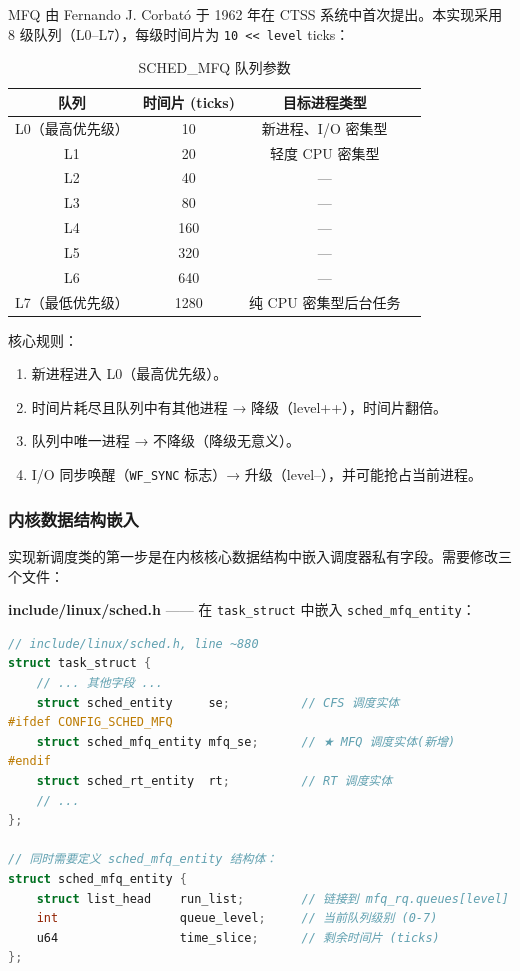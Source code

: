 \documentclass[a4paper]{article}
\begin{document}
MFQ 由 Fernando J. Corbató 于 1962 年在 CTSS 系统中首次提出\cite{mfq_paper}。本实现采用 8 级队列（L0–L7），每级时间片为 \texttt{10 << level} ticks：

\begin{table}[htbp]
\centering
\caption{SCHED\_MFQ 队列参数}
\label{tab:mfq_params}
\begin{tabular}{cccc}
\toprule
\textbf{队列} & \textbf{时间片 (ticks)} & \textbf{目标进程类型} \\
\midrule
L0（最高优先级）& 10 & 新进程、I/O 密集型 \\
L1 & 20 & 轻度 CPU 密集型 \\
L2 & 40 & — \\
L3 & 80 & — \\
L4 & 160 & — \\
L5 & 320 & — \\
L6 & 640 & — \\
L7（最低优先级）& 1280 & 纯 CPU 密集型后台任务 \\
\bottomrule
\end{tabular}
\end{table}

核心规则：
\begin{enumerate}[leftmargin=*]
    \item 新进程进入 L0（最高优先级）。
    \item 时间片耗尽且队列中有其他进程 → 降级（level++），时间片翻倍。
    \item 队列中唯一进程 → 不降级（降级无意义）。
    \item I/O 同步唤醒（\texttt{WF\_SYNC} 标志）→ 升级（level--），并可能抢占当前进程。
\end{enumerate}

\subsubsection{内核数据结构嵌入}

实现新调度类的第一步是在内核核心数据结构中嵌入调度器私有字段。需要修改三个文件：

\textbf{include/linux/sched.h} —— 在 \texttt{task\_struct} 中嵌入 \texttt{sched\_mfq\_entity}：

\begin{lstlisting}[language=C, caption={task\_struct 中的 MFQ 实体嵌入（include/linux/sched.h）}, label={lst:mfq_task_struct}]
// include/linux/sched.h, line ~880
struct task_struct {
    // ... 其他字段 ...
    struct sched_entity     se;          // CFS 调度实体
#ifdef CONFIG_SCHED_MFQ
    struct sched_mfq_entity mfq_se;      // ★ MFQ 调度实体(新增)
#endif
    struct sched_rt_entity  rt;          // RT 调度实体
    // ...
};

// 同时需要定义 sched_mfq_entity 结构体：
struct sched_mfq_entity {
    struct list_head    run_list;        // 链接到 mfq_rq.queues[level]
    int                 queue_level;     // 当前队列级别 (0-7)
    u64                 time_slice;      // 剩余时间片 (ticks)
};
\end{lstlisting}
\end{document}
